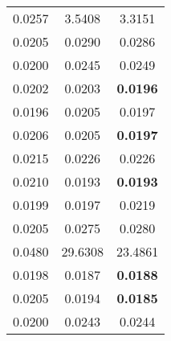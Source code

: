\begin{longtable}{c|c c}
0.0257 & 3.5408 & 3.3151 \\

0.0205 & 0.0290 & 0.0286 \\

0.0200 & 0.0245 & 0.0249 \\

0.0202 & 0.0203 & \textbf{0.0196} \\
\hline
0.0196 & 0.0205 & 0.0197 \\

0.0206 & 0.0205 & \textbf{0.0197} \\

0.0215 & 0.0226 & 0.0226 \\

0.0210 & 0.0193 & \textbf{0.0193} \\

0.0199 & 0.0197 & 0.0219 \\

0.0205 & 0.0275 & 0.0280 \\

0.0480 & 29.6308 & 23.4861 \\

0.0198 & 0.0187 & \textbf{0.0188} \\

0.0205 & 0.0194 & \textbf{0.0185} \\

0.0200 & 0.0243 & 0.0244 \\
 \hline
\end{longtable}
